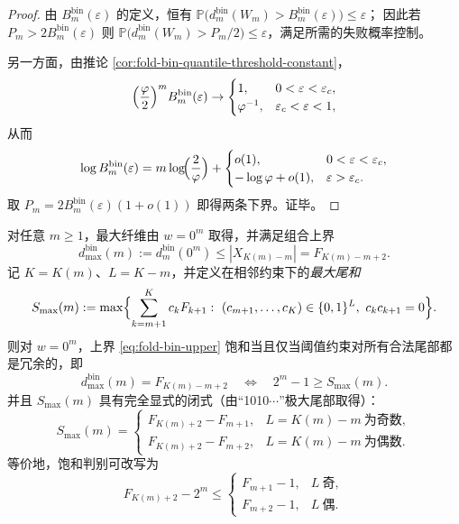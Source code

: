 \begin{proof}
由 \(B^{\mathrm{bin}}_m(\varepsilon)\) 的定义，恒有
\(
\mathbb{P}\bigl(d^{\mathrm{bin}}_m(W_m)>B^{\mathrm{bin}}_m(\varepsilon)\bigr)\le \varepsilon
\)；
因此若 \(P_m>2B^{\mathrm{bin}}_m(\varepsilon)\) 则
\(
\mathbb{P}\bigl(d^{\mathrm{bin}}_m(W_m)>P_m/2\bigr)\le\varepsilon
\)，满足所需的失败概率控制。
\par
另一方面，由推论 \ref{cor:fold-bin-quantile-threshold-constant}，
\[
\Bigl(\frac{\varphi}{2}\Bigr)^m B^{\mathrm{bin}}_m(\varepsilon)\to
\begin{cases}
1,& 0<\varepsilon<\varepsilon_c,\\
\varphi^{-1},& \varepsilon_c<\varepsilon<1,
\end{cases}
\]
从而
\[
\log B^{\mathrm{bin}}_m(\varepsilon)
=m\log\!\Bigl(\frac{2}{\varphi}\Bigr)+
\begin{cases}
o(1),& 0<\varepsilon<\varepsilon_c,\\
-\log\varphi+o(1),& \varepsilon>\varepsilon_c.
\end{cases}
\]
取 \(P_m=2B^{\mathrm{bin}}_m(\varepsilon)(1+o(1))\) 即得两条下界。证毕。
\end{proof}

\begin{corollary}\label{cor:fold-bin-saturation}
对任意 \(m\ge 1\)，最大纤维由 \(w=0^m\) 取得，并满足组合上界
\begin{equation}\label{eq:fold-bin-upper}
d^{\mathrm{bin}}_{\max}(m):=d^{\mathrm{bin}}_m(0^m)\le |X_{K(m)-m}|=F_{K(m)-m+2}.
\end{equation}
记 \(K=K(m)\)、\(L=K-m\)，并定义在相邻约束下的\emph{最大尾和}
\[
S_{\max}(m):=\max\Bigl\{\sum_{k=m+1}^{K} c_k F_{k+1}:\ (c_{m+1},\dots,c_K)\in\{0,1\}^{L},\ c_k c_{k+1}=0\Bigr\}.
\]
则对 \(w=0^m\)，上界 \eqref{eq:fold-bin-upper} 饱和当且仅当阈值约束对所有合法尾部都是冗余的，即
\begin{equation}\label{eq:fold-bin-sat-iff}
d^{\mathrm{bin}}_{\max}(m)=F_{K(m)-m+2}\quad\Longleftrightarrow\quad 2^m-1\ge S_{\max}(m).
\end{equation}
并且 \(S_{\max}(m)\) 具有完全显式的闭式（由“1010\(\cdots\)”极大尾部取得）：
\begin{equation}\label{eq:fold-bin-Smax-closed}
S_{\max}(m)=
\begin{cases}
F_{K(m)+2}-F_{m+1}, & L=K(m)-m\ \text{为奇数},\\
F_{K(m)+2}-F_{m+2}, & L=K(m)-m\ \text{为偶数}.
\end{cases}
\end{equation}
等价地，饱和判别可改写为
\[
F_{K(m)+2}-2^m\le
\begin{cases}
F_{m+1}-1,& L\ \text{奇},\\
F_{m+2}-1,& L\ \text{偶}.
\end{cases}
\]
\end{corollary}

